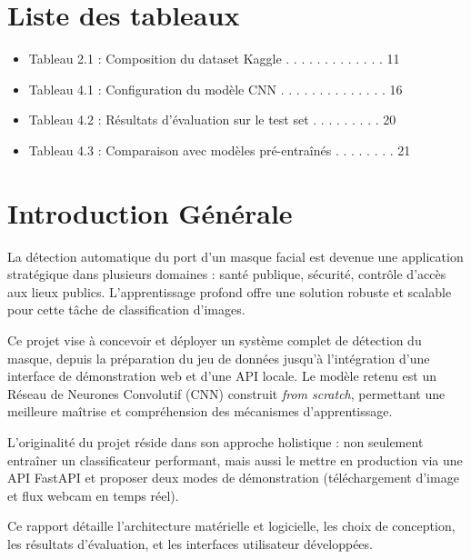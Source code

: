 \documentclass[11pt,a4paper]{article}
\begin{document}
\newpage
\section*{Liste des tableaux}

\begin{itemize}
    \item Tableau 2.1 : Composition du dataset Kaggle . . . . . . . . . . . . . 11
    \item Tableau 4.1 : Configuration du modèle CNN . . . . . . . . . . . . . . 16
    \item Tableau 4.2 : Résultats d'évaluation sur le test set . . . . . . . . . 20
    \item Tableau 4.3 : Comparaison avec modèles pré-entraînés . . . . . . . . 21
\end{itemize}

\newpage
\section*{Introduction Générale}

La détection automatique du port d'un masque facial est devenue une application stratégique dans plusieurs domaines : santé publique, sécurité, contrôle d'accès aux lieux publics. L'apprentissage profond offre une solution robuste et scalable pour cette tâche de classification d'images.

Ce projet vise à concevoir et déployer un système complet de détection du masque, depuis la préparation du jeu de données jusqu'à l'intégration d'une interface de démonstration web et d'une API locale. Le modèle retenu est un Réseau de Neurones Convolutif (CNN) construit \textit{from scratch}, permettant une meilleure maîtrise et compréhension des mécanismes d'apprentissage.

L'originalité du projet réside dans son approche holistique : non seulement entraîner un classificateur performant, mais aussi le mettre en production via une API FastAPI et proposer deux modes de démonstration (téléchargement d'image et flux webcam en temps réel).

Ce rapport détaille l'architecture matérielle et logicielle, les choix de conception, les résultats d'évaluation, et les interfaces utilisateur développées.
\end{document}
